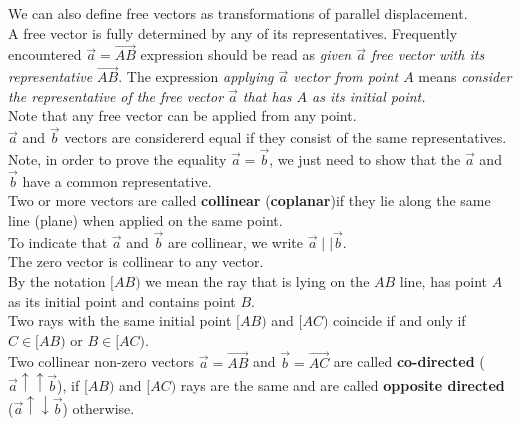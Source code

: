 \documentclass[11pt]{article}
\begin{document}
\noindent We can also define free vectors as transformations of parallel displacement. \\

\noindent A free vector is fully determined by any of its representatives. Frequently encountered \textit{\(\vec{a} = \overrightarrow{AB}\)} expression should be read as \textit{given \(\vec{a}\) free vector with its representative \(\overrightarrow{AB}\)}. The expression \textit{applying \(\vec{a}\) vector from point \(A\)} means \textit{consider the representative of the free vector \(\vec{a}\) that has \(A\) as its initial point.}\\

\noindent Note that any free vector can be applied from any point.\\

\noindent \(\vec{a}\) and \(\vec{b}\) vectors are considererd equal if they consist of the same representatives.\\

\noindent Note, in order to prove the equality \(\vec{a} = \vec{b}\), we just need to show that the \(\vec{a}\) and \(\vec{b}\) have a common representative.\\

\noindent Two or more vectors are called \textbf{collinear} (\textbf{coplanar})if they lie along the same line (plane)  when applied on the same point.\\

\noindent To indicate that \(\vec{a}\) and \(\vec{b}\) are collinear, we write \(\vec{a} \mid\mid \vec{b}\).\\

\noindent The zero vector is collinear to any vector.\\

\noindent By the notation \([AB)\) we mean the ray that is lying on the \(AB\) line, has point \(A\) as its initial point and contains point \(B\).\\

\noindent Two rays with the same initial point \([AB)\) and \([AC)\) coincide if and only if \(C \in [AB)\) or \(B \in [AC)\).\\

\noindent Two collinear non-zero vectors \(\vec{a} = \overrightarrow{AB}\) and \(\vec{b} = \overrightarrow{AC}\) are called \textbf{co-directed} (\(\vec{a} \uparrow\uparrow \vec{b}\)), if \([AB)\) and \([AC)\) rays are the same and are called \textbf{opposite directed} (\(\vec{a} \uparrow \downarrow \vec{b}\)) otherwise.\\
\end{document}
